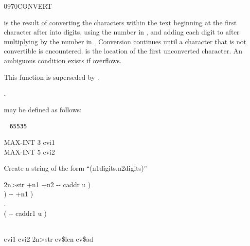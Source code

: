 \begin{worddef}{0970}{CONVERT}
\item {}

	 is the result of converting the characters within
	the text beginning at the first character after 
	into digits, using the number in , and adding each
	digit to  after multiplying  by the
	number in . Conversion continues until a character
	that is not convertible is encountered.  is
	the location of the first unconverted character. An ambiguous
	condition exists if  overflows.

\note
	This function is superseded by .

\see {}.

	\begin{rationale} %
		 may be defined as follows:

		\tab \word{:} ~
			 \texttt{65535}  
		\word{;}
	\end{rationale}

	\begin{testing}\ttfamily

		MAX-INT  3 \word{/}  cvi1 \\
		MAX-INT  5 \word{/}  cvi2

		\textsf{Create a string of the form ``(n1digits.n2digits)''}

		\word{:} 2n>str   +n1 +n2 -{}- caddr u ) \\
		\tab {} \word{[CHAR]} )    	\tab {} -{}- +n1 ) \\
		\tab[2.3] \word{[CHAR]} .    \\
		\tab[2.3] \word{[CHAR]} (  				\tab[6]  -{}- caddr1 u ) \\
		\tab {}         \\
		\word{;}

		cvi1 cvi2 2n>str  cv\$len  cv\$ad

		 \\
	\end{testing}
\end{worddef}


